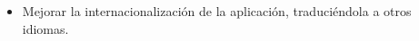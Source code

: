 \begin{itemize}[\textbullet]
\begin{itemize}[◦]
		\item Mejorar la internacionalización de la aplicación, traduciéndola a otros idiomas.
	\end{itemize}
\end{itemize}